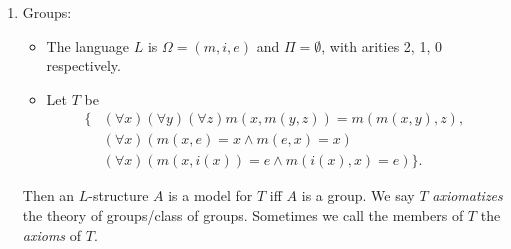 \documentclass[a4paper]{article}
\begin{document}
\begin{eg}\leavevmode
  \begin{enumerate}
    \item Groups:
      \begin{itemize}
        \item The language $L$ is $\Omega = (m, i, e)$ and $\Pi = \emptyset$, with arities 2, 1, 0 respectively.
        \item Let $T$ be 
          \begin{align*}
            \{&(\forall x)(\forall y)(\forall z) m(x,m(y, z)) = m(m(x, y), z),\\
              &(\forall x)(m(x, e) = x \wedge m(e, x) = x)\\
            & (\forall x)(m(x, i(x)) = e \wedge m(i(x), x) = e)\}.
          \end{align*}
      \end{itemize}
      Then an $L$-structure $A$ is a model for $T$ iff $A$ is a group. We say $T$ \emph{axiomatizes} the theory of groups/class of groups. Sometimes we call the members of $T$ the \emph{axioms} of $T$.


\end{enumerate}
\end{eg}
\end{document}
